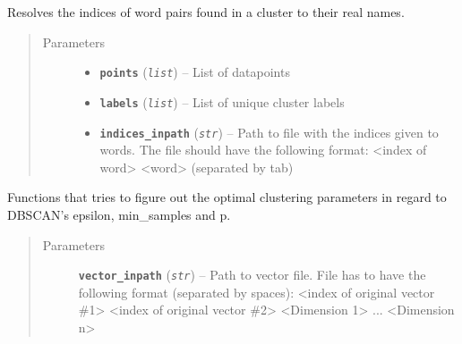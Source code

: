 \documentclass[letterpaper,10pt,english]{sphinxmanual}
\begin{document}
\begin{fulllineitems}
\label{src.clustering:src.clustering.cluster_mappings.resolve_indices}
Resolves the indices of word pairs found in a cluster to their real names.
\begin{quote}\begin{description}
\item[{Parameters}] \leavevmode\begin{itemize}
\item {} 
\textbf{\texttt{points}} (\emph{\texttt{list}}) -- List of datapoints

\item {} 
\textbf{\texttt{labels}} (\emph{\texttt{list}}) -- List of unique cluster labels

\item {} 
\textbf{\texttt{indices\_inpath}} (\emph{\texttt{str}}) -- Path to file with the indices given to words. The file should have the following format:
\textless{}index of word\textgreater{} \textless{}word\textgreater{} (separated by tab)

\end{itemize}

\end{description}\end{quote}

\end{fulllineitems}


\begin{fulllineitems}
\label{src.clustering:src.clustering.cluster_mappings.train_clustering_parameters}
Functions that tries to figure out the optimal clustering parameters in regard to DBSCAN's epsilon,
min\_samples and p.
\begin{quote}\begin{description}
\item[{Parameters}] \leavevmode
\textbf{\texttt{vector\_inpath}} (\emph{\texttt{str}}) -- Path to vector file. File has to have the following format (separated by spaces):
\textless{}index of original vector \#1\textgreater{} \textless{}index of original vector \#2\textgreater{} \textless{}Dimension 1\textgreater{} ... \textless{}Dimension n\textgreater{}

\end{description}\end{quote}

\end{fulllineitems}
\end{document}
